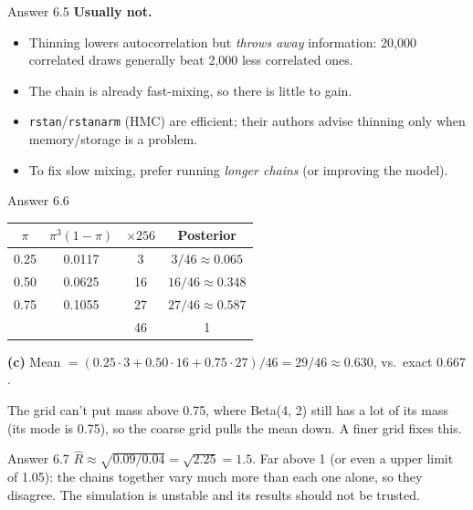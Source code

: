 \documentclass[aspectratio=43,11pt]{beamer}
\begin{document}
\begin{frame}{Answer 6.5}
  \textbf{Usually not.}
  \begin{itemize}
    \item Thinning lowers autocorrelation but \emph{throws away}
      information: 20,000 correlated draws generally beat 2,000 less
      correlated ones.
    \item The chain is already fast-mixing, so there is little to gain.
    \item \texttt{rstan}/\texttt{rstanarm} (HMC) are efficient; their
      authors advise thinning only when memory/storage is a problem.
    \item To fix slow mixing, prefer running \emph{longer chains} (or
      improving the model).
  \end{itemize}
\end{frame}

\begin{frame}{Answer 6.6}
  \begin{center}
  \begin{tabular}{@{}cccc@{}}
    \toprule
    $\pi$ & $\pi^3(1-\pi)$ & $\times 256$ & Posterior \\
    \midrule
    0.25 & 0.0117 & 3 & $3/46 \approx 0.065$ \\
    0.50 & 0.0625 & 16 & $16/46 \approx 0.348$ \\
    0.75 & 0.1055 & 27 & $27/46 \approx 0.587$ \\
    \midrule
    & & 46 & 1 \\
    \bottomrule
  \end{tabular}
  \end{center}
  
  
  \textbf{(c)} Mean $= (0.25 \cdot 3 + 0.50 \cdot 16 + 0.75 \cdot 27)/46
  = 29/46 \approx 0.630$, vs.\ exact $0.667$.
  \vspace{0.3em}

  The grid can't put mass above 0.75, where Beta(4, 2) still has a lot
  of its mass (its mode is 0.75), so the coarse grid pulls the mean down.
  A finer grid fixes this.
\end{frame}

\begin{frame}{Answer 6.7}
  $\hat R \approx \sqrt{0.09/0.04} = \sqrt{2.25} = 1.5$.
  Far above 1 (or even a upper limit of 1.05): the chains together vary much more than each one
  alone, so they disagree. The simulation is unstable and its results
  should not be trusted.
\end{frame}
\end{document}
